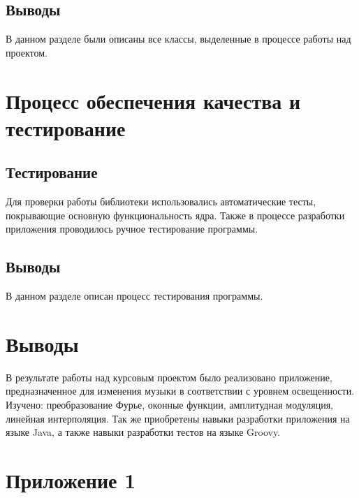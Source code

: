 \documentclass[a4paper]{article}
\begin{document}
\subsection{Выводы}

В данном разделе были описаны все классы, выделенные в процессе работы над проектом.

\section{Процесс обеспечения качества и тестирование}

\subsection{Тестирование}

Для проверки работы библиотеки использовались автоматические тесты, покрывающие основную функциональность ядра. Также в процессе разработки приложения проводилось ручное тестирование программы.

\subsection{Выводы}

В данном разделе описан процесс тестирования программы. 

\section{Выводы}

В результате работы над курсовым проектом было реализовано приложение, предназначенное для изменения музыки в соответствии с уровнем освещенности. Изучено: преобразование Фурье, оконные функции, амплитудная модуляция, линейная интерполяция. Так же приобретены навыки разработки приложения на языке Java, а также навыки разработки тестов на языке Groovy.

\section{Приложение 1}


\parindent=1cm


\parindent=1cm


\parindent=1cm
\end{document}
